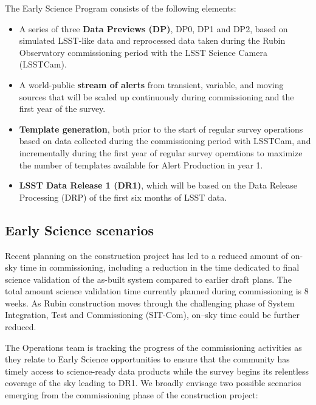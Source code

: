 The Early Science Program consists of the following elements:
\begin{itemize}
	\item A series of three \textbf{Data Previews (DP)}, DP0, DP1 and DP2,  based on simulated LSST-like data and reprocessed data taken during the Rubin Observatory commissioning period with the LSST Science Camera (LSSTCam). 
	\item A world-public \textbf{stream of alerts} from transient, variable, and moving sources that will be scaled up continuously during commissioning and the first year of the survey. 
	\item  \textbf{Template generation}, both prior to the start of regular survey operations based on data collected during the commissioning period with LSSTCam, and incrementally during the first year of regular survey operations  to maximize the number of templates available for Alert Production in year 1. 
	\item \textbf{LSST Data Release 1 (DR1)}, which will be based on the Data Release Processing (DRP) of the first six months of LSST data.
\end{itemize}


\subsection{Early Science scenarios } \label{ssec:scenarios}

Recent planning on the construction project has led to a reduced amount of on-sky time in commissioning, including a reduction in the time dedicated to final science validation of the as-built system compared to earlier draft plans.
The total amount science validation time currently planned during commissioning is 8 weeks.
As Rubin construction moves through the challenging phase of System Integration, Test and Commissioning (SIT-Com), on--sky time could be further reduced.

The Operations team is tracking the progress of the commissioning activities as they relate to Early Science opportunities to ensure that the community has timely access to science-ready data products while the survey begins its relentless coverage of the sky leading to DR1.
We broadly envisage two possible scenarios emerging from the commissioning phase of the construction project: 

